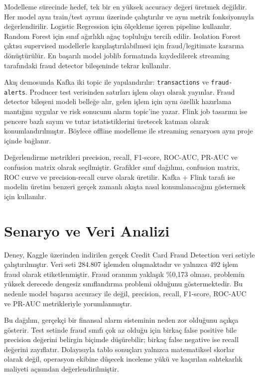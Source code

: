\documentclass[conference]{IEEEtran}
\begin{document}
Modelleme sürecinde hedef, tek bir en yüksek accuracy değeri üretmek değildir. Her model aynı train/test ayrımı üzerinde çalıştırılır ve aynı metrik fonksiyonuyla değerlendirilir. Logistic Regression için ölçekleme içeren pipeline kullanılır. Random Forest için sınıf ağırlıklı ağaç topluluğu tercih edilir. Isolation Forest çıktısı supervised modellerle karşılaştırılabilmesi için fraud/legitimate kararına dönüştürülür. En başarılı model joblib formatında kaydedilerek streaming tarafındaki fraud detector bileşeninde tekrar kullanılır.

Akış demosunda Kafka iki topic ile yapılandırılır: \texttt{transactions} ve \texttt{fraud-alerts}. Producer test verisinden satırları işlem olayı olarak yayınlar. Fraud detector bileşeni modeli belleğe alır, gelen işlem için aynı özellik hazırlama mantığını uygular ve risk sonucunu alarm topic'ine yazar. Flink job tasarımı ise pencere bazlı sayım ve tutar istatistiklerini üretecek katman olarak konumlandırılmıştır. Böylece offline modelleme ile streaming senaryosu aynı proje içinde bağlanır.

Değerlendirme metrikleri precision, recall, F1-score, ROC-AUC, PR-AUC ve confusion matrix olarak seçilmiştir. Grafikler sınıf dağılımı, confusion matrix, ROC curve ve precision-recall curve olarak üretilir. Kafka + Flink tarafı ise modelin üretim benzeri gerçek zamanlı akışta nasıl konumlanacağını göstermek için kullanılır.

\section{Senaryo ve Veri Analizi}

Deney, Kaggle üzerinden indirilen gerçek Credit Card Fraud Detection veri setiyle çalıştırılmıştır. Veri seti 284.807 işlemden oluşmaktadır ve yalnızca 492 işlem fraud olarak etiketlenmiştir. Fraud oranının yaklaşık \%0,173 olması, problemin yüksek derecede dengesiz sınıflandırma problemi olduğunu göstermektedir. Bu nedenle model başarısı accuracy ile değil, precision, recall, F1-score, ROC-AUC ve PR-AUC metrikleriyle yorumlanmıştır.

Bu dağılım, gerçekçi bir finansal alarm sisteminin neden zor olduğunu açıkça gösterir. Test setinde fraud sınıfı çok az olduğu için birkaç false positive bile precision değerini belirgin biçimde düşürebilir; birkaç false negative ise recall değerini zayıflatır. Dolayısıyla tablo sonuçları yalnızca matematiksel skorlar olarak değil, operasyon ekibine düşecek inceleme yükü ve kaçırılan sahtekarlık maliyeti açısından değerlendirilmiştir.
\end{document}
